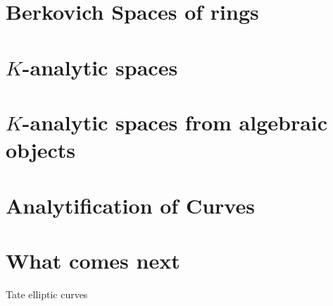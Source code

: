 \documentclass[a4paper]{article}
\begin{document}


\section{Berkovich Spaces of rings} \label{sec:berkovich_spaces}



\section{$K$-analytic spaces} \label{sec:K_analytic_spaces}



\section{$K$-analytic spaces from algebraic objects} \label{sec:berkovich_analytification_of_schemes}



\section{Analytification of Curves} \label{sec:analytification_of_curves}



\section{What comes next} \label{sec:what_comes_next}

Tate elliptic curves

\printbibliography
\end{document}
